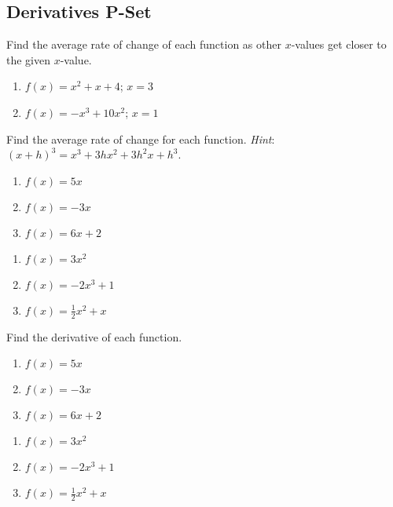 \documentclass{article}
\newcounter{pset}
\begin{document}
\subsection*{Derivatives P-Set}

Find the average rate of change of each function as other $x$-values get closer to the given $x$-value.
\begin{multicols}{2}
\begin{enumerate}
\item $f(x) = x^2 + x + 4$; $x = 3$
\item $f(x) = -x^3 + 10x^2$; $x = 1$
\end{enumerate} \setcounter{pset}{\value{enumi}}
\end{multicols}


Find the average rate of change for each function. \emph{Hint}: $(x+h)^3 = x^3 + 3hx^2 + 3h^2x + h^3$.
\begin{multicols}{3}
\begin{enumerate}       \setcounter{enumi}{\value{pset}}
    \item $f(x) = 5x$  
    \item $f(x) = -3x$  
    \item $f(x) = 6x + 2$   
\end{enumerate} \setcounter{pset}{\value{enumi}}
\end{multicols}
\begin{multicols}{3}
\begin{enumerate}       \setcounter{enumi}{\value{pset}}
    \item $f(x) = 3x^2$ 
    \item $f(x) = -2x^3 + 1$    
    \item $f(x) = \frac{1}{2}x^2 + x$   
\end{enumerate} \setcounter{pset}{\value{enumi}}
\end{multicols}

Find the derivative of each function.
\begin{multicols}{3}
\begin{enumerate}       \setcounter{enumi}{\value{pset}}
    \item $f(x) = 5x$   \label{deriv1}
    \item $f(x) = -3x$  \label{deriv2}
    \item $f(x) = 6x + 2$   \label{deriv3}
\end{enumerate} \setcounter{pset}{\value{enumi}}
\end{multicols}
\begin{multicols}{3}
\begin{enumerate}       \setcounter{enumi}{\value{pset}}
    \item $f(x) = 3x^2$ \label{deriv4}
    \item $f(x) = -2x^3 + 1$    \label{deriv5}
    \item $f(x) = \frac{1}{2}x^2 + x$   \label{deriv6}
\end{enumerate} \setcounter{pset}{\value{enumi}}
\end{multicols}
\end{document}
